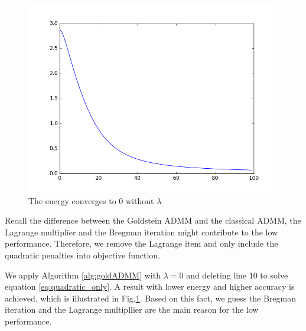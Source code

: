 \documentclass[letterpaper, 10 pt, conference]{ieeeconf}  %
\begin{document}
\begin{figure}
\centering
\includegraphics[width=\columnwidth]{figure/energy_no_lambda.png}
\caption{The energy converges to 0 without $\lambda$}
\label{fig:energyWithoutLambda}
\end{figure}

Recall the difference between the Goldstein ADMM and the classical ADMM, the Lagrange multiplier and the Bregman iteration might contribute to the low performance. Therefore, we remove the Lagrange item and only include the quadratic penalties into objective function.

We apply Algorithm \ref{alg:goldADMM} with $\lambda=0$ and deleting line 10 to solve equation \eqref{eq:quadratic_only}. A result with lower energy and higher accuracy is achieved, which is illustrated in Fig.\ref{fig:energyWithoutLambda}. Based on this fact, we guess the Bregman iteration and the Lagrange multipllier are the main reason for the low performance.
\end{document}
